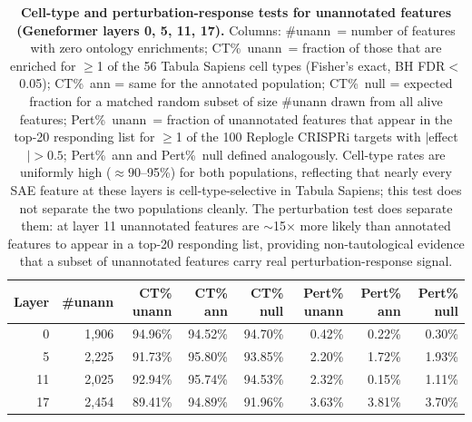 \documentclass[11pt]{article}
\begin{document}
\begin{table}[H]
\centering
\caption{\textbf{Cell-type and perturbation-response tests for unannotated features (Geneformer layers 0, 5, 11, 17).} Columns: \#unann~= number of features with zero ontology enrichments; CT\%~unann~= fraction of those that are enriched for $\geq$1 of the 56 Tabula Sapiens cell types (Fisher's exact, BH FDR$<$0.05); CT\%~ann = same for the annotated population; CT\%~null = expected fraction for a matched random subset of size \#unann drawn from all alive features; Pert\%~unann~= fraction of unannotated features that appear in the top-20 responding list for $\geq$1 of the 100 Replogle CRISPRi targets with $|$effect$| > 0.5$; Pert\%~ann and Pert\%~null defined analogously. Cell-type rates are uniformly high ($\approx 90$--95\%) for both populations, reflecting that nearly every SAE feature at these layers is cell-type-selective in Tabula Sapiens; this test does not separate the two populations cleanly. The perturbation test does separate them: at layer 11 unannotated features are $\sim$15$\times$ more likely than annotated features to appear in a top-20 responding list, providing non-tautological evidence that a subset of unannotated features carry real perturbation-response signal.}
\label{tab:unannotated_new}
\smallskip
\small
\begin{tabular}{rrrrrrrr}
\toprule
Layer & \#unann & CT\% unann & CT\% ann & CT\% null & Pert\% unann & Pert\% ann & Pert\% null \\
\midrule
0  & 1{,}906 & 94.96\% & 94.52\% & 94.70\% & 0.42\% & 0.22\% & 0.30\% \\
5  & 2{,}225 & 91.73\% & 95.80\% & 93.85\% & 2.20\% & 1.72\% & 1.93\% \\
11 & 2{,}025 & 92.94\% & 95.74\% & 94.53\% & 2.32\% & 0.15\% & 1.11\% \\
17 & 2{,}454 & 89.41\% & 94.89\% & 91.96\% & 3.63\% & 3.81\% & 3.70\% \\
\bottomrule
\end{tabular}
\end{table}
\end{document}
